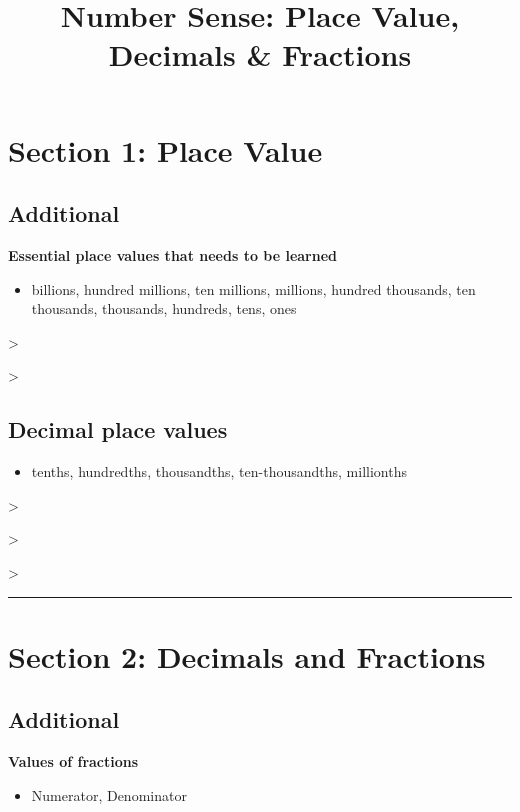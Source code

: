 \documentclass[12pt]{article}
\title{Number Sense: Place Value, Decimals \& Fractions}
\author{}
\date{}
\begin{document}
\maketitle

\section*{Section 1: Place Value}

\subsection*{Additional}
\textbf{Essential place values that needs to be learned}
\begin{itemize}
  \item billions, hundred millions, ten millions, millions, hundred thousands, ten thousands, thousands, hundreds, tens, ones
\end{itemize}

\noindent\textgreater\ 

\noindent\textgreater\ 

\subsection*{Decimal place values}
\begin{itemize}
  \item tenths, hundredths, thousandths, ten-thousandths, millionths
\end{itemize}

\noindent\textgreater\ 

\noindent\textgreater\ 

\noindent\textgreater\ 

\bigskip
\hrule
\bigskip

\section*{Section 2: Decimals and Fractions}

\subsection*{Additional}
\textbf{Values of fractions}
\begin{itemize}
  \item Numerator, Denominator
\end{itemize}
\end{document}
